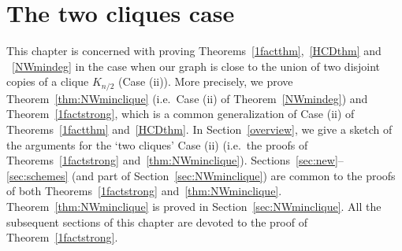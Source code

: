 \documentclass{memo-l}
\numberwithin{section}{chapter}
\numberwithin{equation}{section}
\numberwithin{firstthm}{section}
\numberwithin{figure}{section}
\begin{document}
\chapter{The two cliques case}\label{paper1}
This chapter is concerned with proving Theorems~\ref{1factthm},~\ref{HCDthm} and ~\ref{NWmindeg} in the case when our graph is close  to the union of two disjoint copies of a clique $K_{n/2}$ (Case (ii)).
More precisely, we prove Theorem~\ref{thm:NWminclique} (i.e.~Case (ii) of Theorem~\ref{NWmindeg})
and  Theorem~\ref{1factstrong}, which is a common generalization of 
Case (ii) of Theorems~\ref{1factthm} and~\ref{HCDthm}.
In Section~\ref{overview}, we give a sketch of the arguments for the `two cliques' Case (ii)
(i.e.~the proofs of Theorems~\ref{1factstrong} and~\ref{thm:NWminclique}).
Sections~\ref{sec:new}--\ref{sec:schemes} (and part of  Section~\ref{sec:NWminclique})
are common to the proofs of both Theorems~\ref{1factstrong} and~\ref{thm:NWminclique}.
Theorem~\ref{thm:NWminclique} is proved in Section~\ref{sec:NWminclique}.
All the subsequent sections of this chapter are devoted to the proof of Theorem~\ref{1factstrong}.
\end{document}
